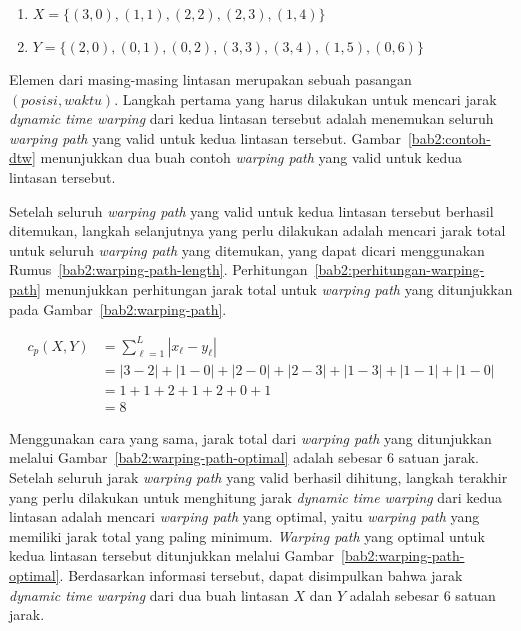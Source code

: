 \begin{enumerate}
    \item $X = \{ (3, 0), (1, 1), (2, 2), (2, 3), (1, 4) \}$
    \item $Y = \{ (2, 0), (0, 1), (0, 2), (3, 3), (3, 4), (1, 5), (0, 6) \}$
\end{enumerate}

Elemen dari masing-masing lintasan merupakan sebuah pasangan $(posisi, waktu)$. Langkah pertama yang harus dilakukan untuk mencari jarak \textit{dynamic time warping} dari kedua lintasan tersebut adalah menemukan seluruh \textit{warping path} yang valid untuk kedua lintasan tersebut. Gambar~\ref{bab2:contoh-dtw} menunjukkan dua buah contoh \textit{warping path} yang valid untuk kedua lintasan tersebut.

Setelah seluruh \textit{warping path} yang valid untuk kedua lintasan tersebut berhasil ditemukan, langkah selanjutnya yang perlu dilakukan adalah mencari jarak total untuk seluruh \textit{warping path} yang ditemukan, yang dapat dicari menggunakan Rumus~\ref{bab2:warping-path-length}. Perhitungan~\ref{bab2:perhitungan-warping-path} menunjukkan perhitungan jarak total untuk \textit{warping path} yang ditunjukkan pada Gambar~\ref{bab2:warping-path}.

\begin{equation}
    \begin{aligned}
        c_p(X, Y) & = \sum_{\ell = 1}^{L} |x_\ell - y_\ell| \\
        & = |3 - 2| + |1 - 0| + |2 - 0| + |2 - 3| + |1 - 3| + |1 - 1| + |1 - 0| \\
        & = 1 + 1 + 2 + 1 + 2 + 0 + 1 \\
        & = 8
    \end{aligned}
    \label{bab2:perhitungan-warping-path}
\end{equation}

\clearpage

Menggunakan cara yang sama, jarak total dari \textit{warping path} yang ditunjukkan melalui Gambar~\ref{bab2:warping-path-optimal} adalah sebesar $6$ satuan jarak. Setelah seluruh jarak \textit{warping path} yang valid berhasil dihitung, langkah terakhir yang perlu dilakukan untuk menghitung jarak \textit{dynamic time warping} dari kedua lintasan adalah mencari \textit{warping path} yang optimal, yaitu \textit{warping path} yang memiliki jarak total yang paling minimum. \textit{Warping path} yang optimal untuk kedua lintasan tersebut ditunjukkan melalui Gambar~\ref{bab2:warping-path-optimal}. Berdasarkan informasi tersebut, dapat disimpulkan bahwa jarak \textit{dynamic time warping} dari dua buah lintasan $X$ dan $Y$ adalah sebesar $6$ satuan jarak.

